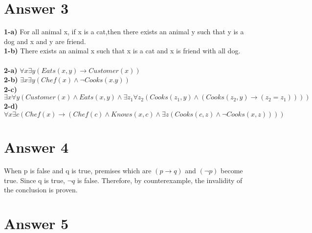 \documentclass[12pt]{article}
\begin{document}
\section*{Answer 3}

\textbf{1-a)} For all animal x, if x is a cat,then there exists an animal y such that y is a dog and x and y are friend.\\
\textbf{1-b)} There exists an animal x such that x is a cat and x is friend with all dog.\\
\\
\textbf{2-a)} $\forall x \exists y (Eats(x,y) \rightarrow Customer(x))$\\
\textbf{2-b)} $\exists x \exists y ( Chef(x) \wedge \neg Cooks(x.y))$\\
\textbf{2-c)} $\exists x \forall y (Customer(x) \wedge Eats(x,y) \wedge \exists z_1 \forall z_2(Cooks(z_1,y) \wedge (Cooks(z_2,y) \rightarrow (z_2 = z_1))))$\\
\textbf{2-d)} $\forall x \exists c ( Chef(x) \rightarrow (Chef(c) \wedge Knows(x,c) \wedge \exists z(Cooks(c,z)\wedge \neg Cooks(x,z)))) $



\section*{Answer 4}


When p is false and q is true, premises which are $(p \rightarrow q)$ and $(\neg p)$ become true. Since q is true, $\neg q$ is false. Therefore, by counterexample, the invalidity of the conclusion is proven.


\section*{Answer 5}
\end{document}
